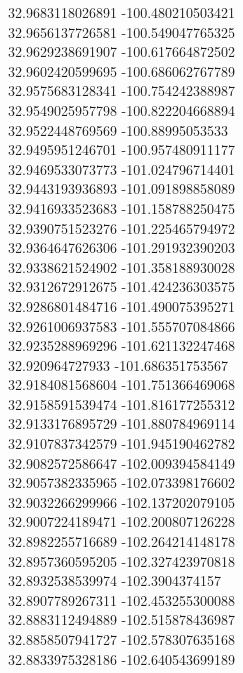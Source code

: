 {32.9683118026891	-100.480210503421\\
32.9656137726581	-100.549047765325\\
32.9629238691907	-100.617664872502\\
32.9602420599695	-100.686062767789\\
32.9575683128341	-100.754242388987\\
32.9549025957798	-100.822204668894\\
32.9522448769569	-100.88995053533\\
32.9495951246701	-100.957480911177\\
32.9469533073773	-101.024796714401\\
32.9443193936893	-101.091898858089\\
32.9416933523683	-101.158788250475\\
32.9390751523276	-101.225465794972\\
32.9364647626306	-101.291932390203\\
32.9338621524902	-101.358188930028\\
32.9312672912675	-101.424236303575\\
32.9286801484716	-101.490075395271\\
32.9261006937583	-101.555707084866\\
32.9235288969296	-101.621132247468\\
32.920964727933	-101.686351753567\\
32.9184081568604	-101.751366469068\\
32.9158591539474	-101.816177255312\\
32.9133176895729	-101.880784969114\\
32.9107837342579	-101.945190462782\\
32.9082572586647	-102.009394584149\\
32.9057382335965	-102.073398176602\\
32.9032266299966	-102.137202079105\\
32.9007224189471	-102.200807126228\\
32.8982255716689	-102.264214148178\\
32.8957360595205	-102.327423970818\\
32.8932538539974	-102.3904374157\\
32.8907789267311	-102.453255300088\\
32.8883112494889	-102.515878436987\\
32.8858507941727	-102.578307635168\\
32.8833975328186	-102.640543699189\\
}

